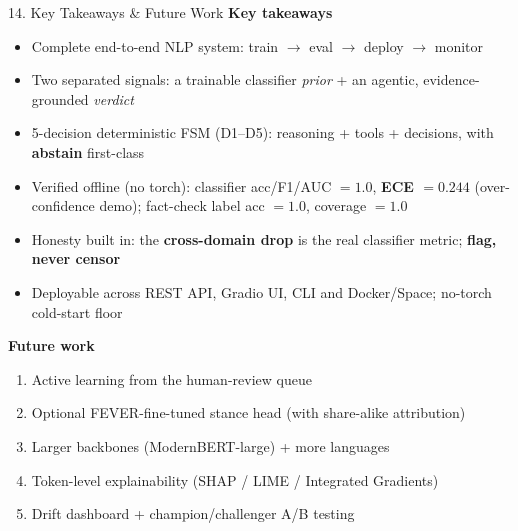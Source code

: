 \documentclass[10pt,aspectratio=169]{beamer}
\begin{document}
\begin{frame}{14. Key Takeaways \& Future Work}
\textbf{Key takeaways}
\begin{itemize}\small
  \item Complete end-to-end NLP system: train $\rightarrow$ eval $\rightarrow$ deploy $\rightarrow$ monitor
  \item Two separated signals: a trainable classifier \emph{prior} + an agentic, evidence-grounded \emph{verdict}
  \item 5-decision deterministic FSM (D1--D5): reasoning + tools + decisions, with \textbf{abstain} first-class
  \item Verified offline (no torch): classifier acc/F1/AUC $=1.0$, \textbf{ECE $=0.244$} (over-confidence demo); fact-check label acc $=1.0$, coverage $=1.0$
  \item Honesty built in: the \textbf{cross-domain drop} is the real classifier metric; \textbf{flag, never censor}
  \item Deployable across REST API, Gradio UI, CLI and Docker/Space; no-torch cold-start floor
\end{itemize}

\textbf{Future work}
\begin{enumerate}\small
  \item Active learning from the human-review queue
  \item Optional FEVER-fine-tuned stance head (with share-alike attribution)
  \item Larger backbones (ModernBERT-large) + more languages
  \item Token-level explainability (SHAP / LIME / Integrated Gradients)
  \item Drift dashboard + champion/challenger A/B testing
\end{enumerate}
\end{frame}
\end{document}
